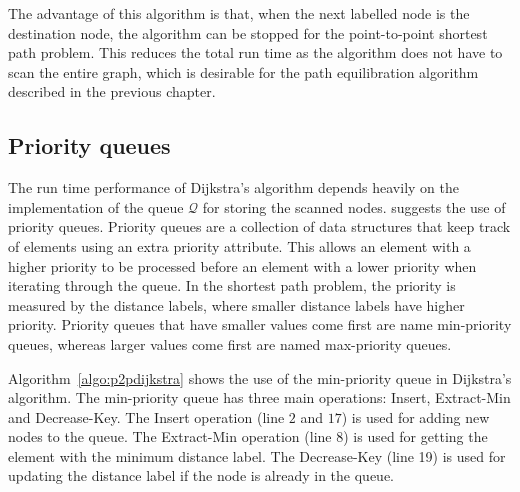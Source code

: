 The advantage of this algorithm is that,
when the next labelled node is the destination node,
the algorithm can be stopped for the point-to-point shortest path problem.
This reduces the total run time as the algorithm does not have to scan the entire graph,
which is desirable for the path equilibration algorithm described in the previous chapter.

\subsection{Priority queues} \label{sec:pq}
The run time performance of Dijkstra's algorithm depends heavily on the implementation of the queue $\mathcal{Q}$ for storing the scanned nodes.
\citet{Cormen} suggests the use of priority queues.
Priority queues are a collection of data structures
that keep track of elements using an extra priority attribute.
This allows an element with a higher priority to be processed before an element with a lower priority when iterating through the queue.
In the shortest path problem, the priority is measured by the distance labels, where smaller distance labels have higher priority.
Priority queues that have smaller values come first are name min-priority queues, whereas larger values come first are named max-priority queues.

Algorithm~\ref{algo:p2pdijkstra} shows the use of the min-priority queue in Dijkstra's algorithm.
The min-priority queue has three main operations: Insert, Extract-Min and Decrease-Key.
The Insert operation (line $2$ and $17$) is used for adding new nodes to the queue.
The Extract-Min operation (line 8) is used for getting the element with the minimum distance label.
The Decrease-Key (line 19) is used for updating the distance label if the node is already in the queue.

